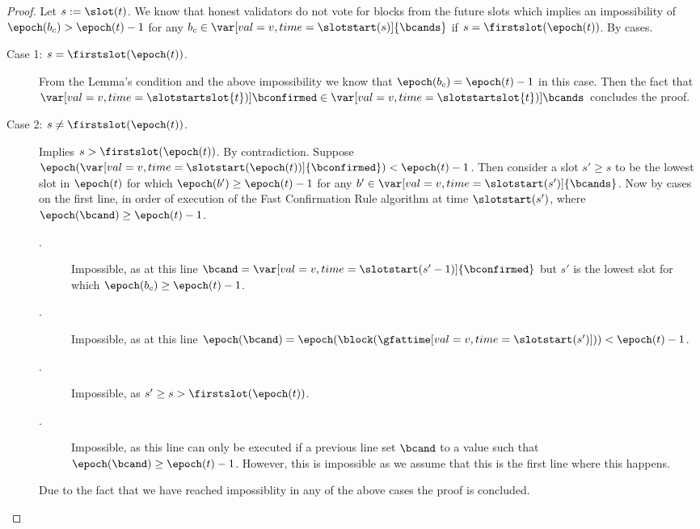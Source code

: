 \documentclass{article}
\begin{document}
\begin{proof}
    Let $s := \slot(t)$.
    We know that honest validators do not vote for blocks from the future slots which implies an impossibility of $\epoch(b_c) > \epoch(t)-1$ for any $b_c \in \var[val=v,time=\slotstart(s)]{\bcands}$ if $s=\firstslot(\epoch(t))$.
    By cases.
    \begin{description}
        \item[Case 1: {$s = \firstslot(\epoch(t))$}.]
        From the Lemma's condition and the above impossibility we know that $\epoch(b_c) = \epoch(t)-1$ in this case.
        Then the fact that $\var[val=v,time=\slotstartslot{t})]{\bconfirmed} \in \var[val=v,time=\slotstartslot{t})]{\bcands}$ concludes the proof.
        \item[Case 2: {$s \neq \firstslot(\epoch(t))$}.] Implies $s > \firstslot(\epoch(t))$.
        By contradiction.
        Suppose $\epoch(\var[val=v,time=\slotstart(\epoch(t))]{\bconfirmed}) < \epoch(t)-1$.
        Then consider a slot $s' \geq s$ to be the lowest slot in $\epoch(t)$ for which $\epoch(b') \geq \epoch(t)-1$ for any $b' \in \var[val=v,time=\slotstart(s')]{\bcands}$.
        Now by cases on the first line, in order of execution of the Fast Confirmation Rule algorithm at time $\slotstart(s')$, where $\epoch(\bcand) \geq \epoch(t)-1$. 
        \begin{description}
            \item[.] 
            Impossible, as at this line $\bcand = \var[val=v,time=\slotstart(s'-1)]{\bconfirmed}$ but $s'$ is the lowest slot for which $\epoch(b_c) \geq \epoch(t)-1$.
            \item[.] Impossible, as at this line $\epoch(\bcand) = \epoch(\block(\gfattime[val=v,time=\slotstart(s')])) < \epoch(t)-1$.
            \item[.] Impossible, as $s' \geq s > \firstslot(\epoch(t))$.
            \item[.] Impossible, as this line can only be executed if a previous line set $\bcand$ to a value such that $\epoch(\bcand) \geq \epoch(t)-1$. However, this  is impossible as we assume that this is the first line where this happens.
        \end{description}
        Due to the fact that we have reached impossiblity in any of the above cases the proof is concluded.
    \end{description}
\end{proof}
\end{document}

